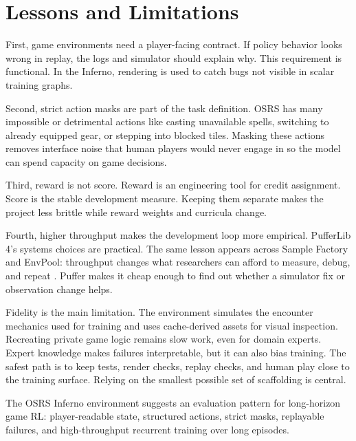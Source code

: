 \documentclass[10pt]{article}
\begin{document}
\section{Lessons and Limitations}

First, game environments need a player-facing contract. If policy behavior looks wrong in replay, the logs and simulator should explain why. This requirement is functional. In the Inferno, rendering is used to catch bugs not visible in scalar training graphs.

Second, strict action masks are part of the task definition. OSRS has many impossible or detrimental actions like casting unavailable spells, switching to already equipped gear, or stepping into blocked tiles. Masking these actions removes interface noise that human players would never engage in so the model can spend capacity on game decisions.

Third, reward is not score. Reward is an engineering tool for credit assignment. Score is the stable development measure. Keeping them separate makes the project less brittle while reward weights and curricula change.

Fourth, higher throughput makes the development loop more empirical. PufferLib 4's systems choices are practical. The same lesson appears across Sample Factory and EnvPool: throughput changes what researchers can afford to measure, debug, and repeat \cite{sample-factory, envpool}. Puffer makes it cheap enough to find out whether a simulator fix or observation change helps.

Fidelity is the main limitation. The environment simulates the encounter mechanics used for training and uses cache-derived assets for visual inspection. Recreating private game logic remains slow work, even for domain experts. Expert knowledge makes failures interpretable, but it can also bias training. The safest path is to keep tests, render checks, replay checks, and human play close to the training surface. Relying on the smallest possible set of scaffolding is central.

The OSRS Inferno environment suggests an evaluation pattern for long-horizon game RL: player-readable state, structured actions, strict masks, replayable failures, and high-throughput recurrent training over long episodes.
\end{document}
